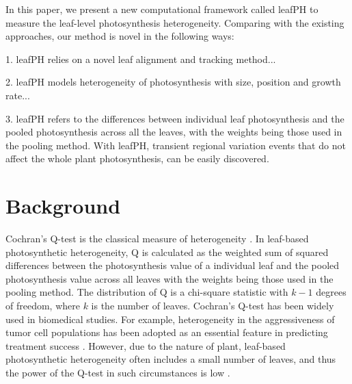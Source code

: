\documentclass[times,11pt]{article}
\begin{document}
{In this paper, we present a new computational framework called leafPH to measure the leaf-level photosynthesis heterogeneity. Comparing with the existing approaches, our method is novel in the following ways:

1.	leafPH relies on a novel leaf alignment and tracking method... %

2. leafPH models heterogeneity of photosynthesis with size, position and growth rate...

3. leafPH refers to the differences between individual leaf photosynthesis and the pooled photosynthesis across all the leaves, with the weights being those used in the pooling method. With leafPH, transient regional variation events that do not affect the whole plant photosynthesis, can be easily discovered.




\section{Background} %

Cochran's Q-test is the classical measure of heterogeneity \cite{conover1999Practical}. In leaf-based photosynthetic heterogeneity, Q is calculated as the weighted sum of squared differences between the photosynthesis value of a individual leaf and the pooled photosynthesis value across all leaves with the weights being those used in the pooling method. The distribution of Q is a chi-square statistic with $k-1$ degrees of freedom, where $k$ is the number of leaves. Cochran's Q-test has been widely used in biomedical studies. For example, heterogeneity in the aggressiveness of tumor cell populations has been adopted as an essential feature in predicting treatment success \cite{OSullivan2003}. However, due to the nature of plant, leaf-based photosynthetic heterogeneity often includes a small number of leaves, and thus the power of the Q-test in such circumstances is low \cite{higgins2003measuring, gavaghan2000evaluation}.
%

}
\end{document}
